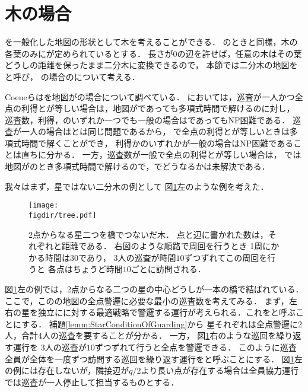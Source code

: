 \section*{木の場合}

{\graphStar}を一般化した地図の形状として木を考えることができる．
{\graphStar}のときと同様，木の各葉のみに{\maxIdletime}が定められているとする．
長さが$0$の辺を許せば，任意の木はその葉どうしの距離を保ったまま二分木に変換できるので，
本節では二分木の地図を{\graphTree}と呼び，
{\graphTree}の場合の{\PPProfit}について考える．

Coeneら\cite{coene2011charlemagne}は{\independentPP}を地図が{\graphTree}の場合について調べている．
{\independentPP}においては，巡査が一人かつ全点の利得と{\maxIdletime}が等しい場合は，地図が{\graphTree}であっても多項式時間で解ける\cite[Corollary~3]{coene2011charlemagne}のに対し，
巡査数，利得，{\maxIdletime}のいずれか一つでも一般の場合は{\graphStar}であってもNP困難である\cite[Theorems 5, 6 and 10]{coene2011charlemagne}．
巡査が一人の場合は{\PPProfit}と{\independentPP}は同じ問題であるから，
{\graphTree}で全点の利得と{\maxIdletime}が等しいときは多項式時間で解くことができ，
利得か{\maxIdletime}のいずれかが一般の場合はNP困難であることは直ちに分かる．
一方，巡査数が一般で全点の利得と{\maxIdletime}が等しい場合は，
{\PPProfit}では
地図が{\graphStar}のとき多項式時間で解けるので，{\graphTree}でどうなるかは未解決である．

\newcommand{\separatedPatroll}{左右独立運行}
\newcommand{\cooperativePatroll}{全員協力運行}


我々はまず，星ではない二分木の例として
図\ref{figure: twoStarsTree}左のような例を考えた．
\begin{figure}
  \centering
  \texttt{[image: \\figdir/tree.pdf]}
  \caption{
    $2$点からなる星二つを橋でつないだ木．
    点と辺に書かれた数は，それぞれ{\maxIdletime}と距離である．
    右図のような順路で周回を行うとき
    1周にかかる時間は$30$であり，
    $3$人の巡査が時間$10$ずつずれてこの周回を行うと
    各点はちょうど時間$10$ごとに訪問される．}
  \label{figure: twoStarsTree}
\end{figure}
図\ref{figure: twoStarsTree}左の例では，2点からなる二つの星の中心どうしが一本の橋で結ばれている．
ここで，この{\graphTree}の地図の全点警邏に必要な最小の巡査数を考えてみる．
%
まず，左右の星を独立に{\graphStar}に対する最適戦略で警邏する運行が考えられる．これを\defword{\separatedPatroll}と呼ぶことにする．
補題\ref{lemm:StarConditionOfGuarding}から
星それぞれは全点警邏に2人，合計$4$人の巡査を要することが分かる．
%
一方，
図\ref{figure: twoStarsTree}右のような巡回を繰り返す運行を
$3$人の巡査が{\maxIdletime}$10$ずつずれて行うと全点を警邏できる．
このように巡査全員が全体を一度ずつ訪問する巡回を繰り返す運行を\defword{\cooperativePatroll}と呼ぶことにする．
図\ref{figure: twoStarsTree}左の例には存在しないが，隣接辺が$q/2$より長い点が存在する場合は{\cooperativePatroll}では巡査が一人停止して担当するものとする．

